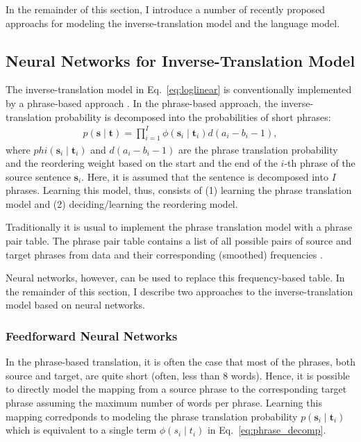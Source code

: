 \documentclass[11pt, oneside]{essay}
\newcommand{\vect}[1]{\mathbf{#1}}
\newcommand{\vs}[0]{\vect{s}}
\newcommand{\vt}[0]{\vect{t}}
\begin{document}
In the remainder of this section, I introduce a number of
recently proposed approachs for modeling the
inverse-translation model and the language model.

\subsection{Neural Networks for Inverse-Translation Model}

The inverse-translation model in Eq.~\eqref{eq:loglinear} is
conventionally implemented by a phrase-based approach \citep[see,
e.g.,][]{Koehn2003,Marcu2002}.  In the
phrase-based approach, the inverse-translation
probability is decomposed into the probabilities
of short phrases:
\begin{align}
\label{eq:phrase_decomp}
    p(\vs \mid \vt) = \prod_{i=1}^{I} \phi(\vs_i \mid \vt_i) d(a_i -
    b_i -1),
\end{align}
where $phi(\vs_i \mid \vt_i)$ and $d(a_i - b_i - 1)$ are the phrase
translation probability and the reordering weight based on the
start and the end of the $i$-th phrase of the source sentence
$\vs_i$. Here, it is assumed that the sentence is decomposed into
$I$ phrases. Learning this model, thus, consists of (1) learning
the phrase translation model and (2) deciding/learning the
reordering model.  

Traditionally it is usual to implement the phrase translation
model with a phrase pair table. The phrase pair table contains a
list of all possible pairs of source and target phrases from data
and their corresponding (smoothed) frequencies \citep[see,
e.g.,][]{Koehn2003,Koehn2010}. 

Neural networks, however, can be used to replace this
frequency-based table. In the remainder of this section, I
describe two approaches to the inverse-translation model based on
neural networks.

\subsubsection{Feedforward Neural Networks}

In the phrase-based translation, it is often the case that most
of the phrases, both source and target, are quite short (often,
        less than $8$ words). Hence, it is possible to directly
model the mapping from a source phrase to the corresponding
target phrase assuming the maximum number of words per phrase.
Learning this mapping corredponds to modeling the phrase
translation probability $p(\vs_i \mid \vt_i)$ which is equivalent to
a single term $\phi(s_i \mid t_i)$ in
Eq.~\eqref{eq:phrase_decomp}.
\end{document}
